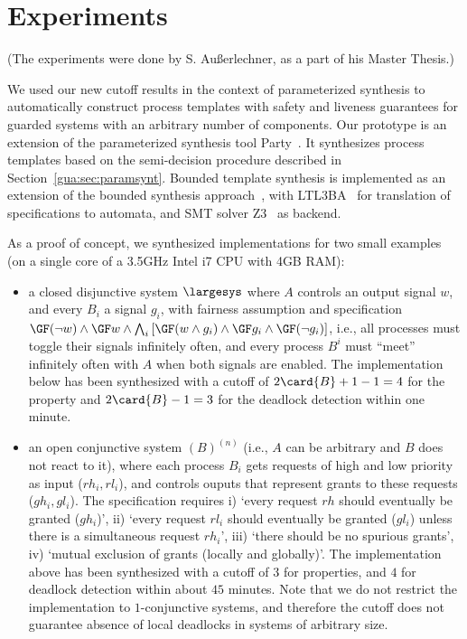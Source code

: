 \section{Experiments} \label{gua:sec:experiments}

(The experiments were done by S. Au{\ss}erlechner,
 as a part of his Master Thesis.)

We used our new cutoff results in the context of parameterized synthesis to 
automatically construct process templates with safety and liveness guarantees 
for guarded systems with an arbitrary number of components.
Our prototype is an extension of the parameterized synthesis tool 
{\sc Party}~\cite{party}.
It synthesizes process templates based on the semi-decision procedure 
described in Section~\ref{gua:sec:paramsynt}. 
Bounded template synthesis is 
implemented as an extension of the bounded synthesis approach~\cite{BS}, with
LTL3BA~\cite{LTL3BA} for translation of specifications to automata, and
SMT solver Z3~\cite{Moura08} as backend. 

%
As a proof of concept, we synthesized implementations for two small 
examples (on a single core of a 3.5GHz Intel i7 CPU with 4GB RAM):
\begin{itemize}
\item a closed disjunctive system $\largesys$ where $A$ controls an output 
signal $w$, and every $B_i$ a signal $g_i$, with fairness assumption and specification
$\GF(\neg w) \wedge \GF w \wedge 
\bigwedge_{i} \left[\GF(w \wedge g_i) \wedge  \GF g_i \wedge \GF(\neg g_i) 
\right]$,
i.e., all processes must toggle their signals 
infinitely often, and every process $B^i$ must ``meet'' infinitely often with 
$A$ when both signals are enabled. The implementation below has been synthesized with a cutoff of $2\card{B}+1-1=4$ for the property and $2\card{B}-1=3$ for the deadlock detection within one minute.

\item an open conjunctive system $(B)^{(n)}$ (i.e., $A$ can be arbitrary and $B$ does not react to it), where each process $B_i$ gets requests of high and low priority as input ($rh_i, rl_i$), and controls ouputs that represent grants to these requests ($gh_i, gl_i$). The specification requires i) `every request $rh$ should eventually be granted ($gh_i$)', ii) `every request $rl_i$ should eventually be granted ($gl_i$) unless there is a simultaneous request $rh_i$', iii) `there should be no spurious grants', iv) `mutual exclusion of grants (locally and globally)'. The implementation above has been synthesized with a cutoff of $3$ for properties, and $4$ for deadlock detection within about $45$ minutes. Note that we do not restrict the implementation to $1$-conjunctive systems, and therefore the cutoff does not guarantee absence of local deadlocks in systems of arbitrary size.
\end{itemize}

